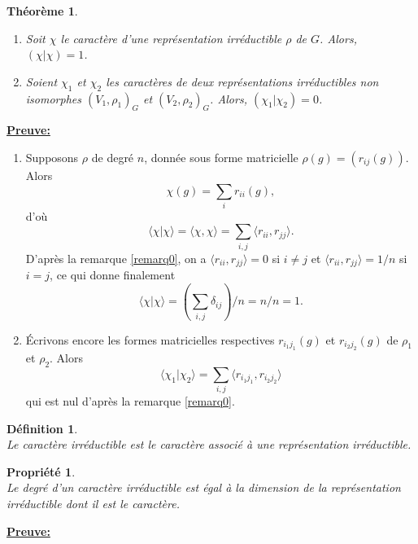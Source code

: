 \documentclass[a4paper, 14pt]{report}
\newtheorem{definition}{Définition}[section]
\newtheorem{propriety}{Propriété}[section]
\newtheorem{theorem}{Théorème}[section]
\begin{document}
\begin{onehalfspace}
{\begin{theorem} \cite{serre1971representation}
	\begin{enumerate}[label=\roman*)]
		\item Soit \( \chi \) le caractère d’une représentation irréductible \( \rho \) de \( G \). Alors, \( (\chi | \chi) = 1 \).
		\item Soient \( \chi_1 \) et \( \chi_2 \) les caractères de deux représentations irréductibles non isomorphes \((V_1,\rho_1)_{G}\) et \((V_2,\rho_2)_{G}\). Alors, \( (\chi_1 | \chi_2) = 0 \).
	\end{enumerate}
\end{theorem}

\textbf{\underline{Preuve:}}
\begin{enumerate} [label=\roman*)]
	\item Supposons \( \rho \) de degré \( n \), donnée sous forme matricielle \( \rho(g) = (r_{ij}(g)) \). Alors 
	\[
	\chi(g) = \sum_i r_{ii}(g),
	\]
	d'où 
	\[
	\langle \chi | \chi \rangle = \langle \chi, \chi \rangle = \sum_{i,j} \langle r_{ii}, r_{jj} \rangle.
	\]
D'après la remarque \ref{remarq0}, on a \( \langle r_{ii}, r_{jj} \rangle = 0 \) si \( i \neq j \) et \( \langle r_{ii}, r_{jj} \rangle = 1/n \) si \( i = j \), ce qui donne finalement 
	\[
	\langle \chi | \chi \rangle = \left( \sum_{i,j} \delta_{ij} \right) / n = n / n = 1.
	\]
	
	\item Écrivons encore les formes matricielles respectives \( r_{i_1 j_1}(g) \) et \( r_{i_2 j_2}(g) \)
	 de \( \rho_1 \) et \( \rho_2 \). Alors 
	\[
	\langle \chi_1 | \chi_2 \rangle = \sum_{i,j} \langle r_{i_1 j_1}, r_{i_2 j_2} \rangle
	\]
	qui est nul d'après la remarque \ref{remarq0}.
\end{enumerate}

\begin{definition} \cite{renard2009groupes} \\
Le caractère irréductible est  le caractère associé à une représentation irréductible.
\end{definition}

\begin{propriety}\cite{renard2009groupes} \\
Le degré d’un caractère irréductible est égal à la dimension de la représentation irréductible dont il est le caractère.
\end{propriety}

\textbf{\underline{Preuve:}}\\

}
\end{onehalfspace}
\end{document}
